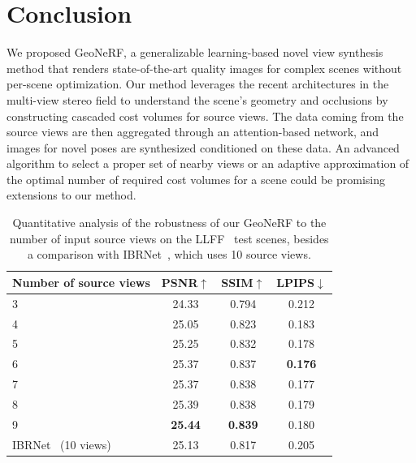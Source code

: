 \section{Conclusion}
We proposed GeoNeRF, a generalizable learning-based novel view synthesis method that renders state-of-the-art quality images for complex scenes without per-scene optimization. Our method leverages the recent architectures in the multi-view stereo field to understand the scene's geometry and occlusions by constructing cascaded cost volumes for source views. The data coming from the source views are then aggregated through an attention-based network, and images for novel poses are synthesized conditioned on these data. An advanced algorithm to select a proper set of nearby views or an adaptive approximation of the optimal number of required cost volumes for a scene could be promising extensions to our method.

\begin{table}[!t]
\begin{center}
        \begin{tabular}{l|ccc}
        \hline
        Number of source views & PSNR$\uparrow$ & SSIM$\uparrow$ & LPIPS$\downarrow$  \\
        \hline
        3 & 24.33 & 0.794 & 0.212  \\
        4 & 25.05 & 0.823 & 0.183  \\
        5 & 25.25 & 0.832 & 0.178  \\
        6  & 25.37 & 0.837 & \textbf{0.176} \\
        7 & 25.37 & 0.838 & 0.177  \\
        8 & 25.39 & 0.838 & 0.179  \\
        9 & \textbf{25.44} & \textbf{0.839} & 0.180  \\
        \hline
        IBRNet~\cite{wang2021ibrnet} (10 views) & 25.13 & 0.817 & 0.205  \\
        \hline
        \end{tabular}
    \end{center}
    \caption{Quantitative analysis of the robustness of our GeoNeRF to the number of input source views on the LLFF~\cite{mildenhall2019llff} test scenes, besides a comparison with IBRNet~\cite{wang2021ibrnet}, which uses 10 source views.}
    \label{table:n_views}
\end{table}

